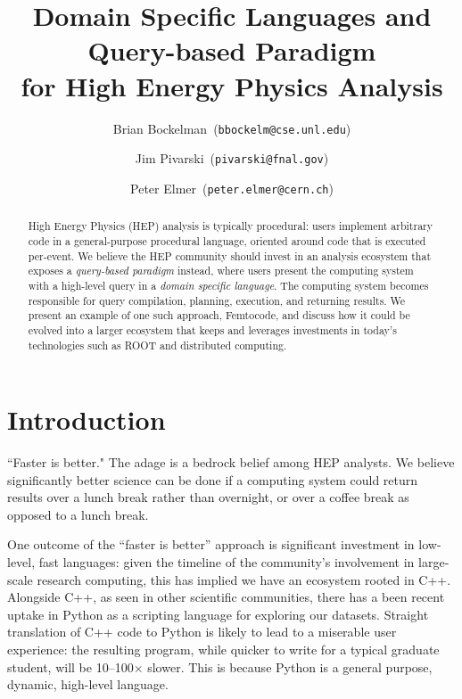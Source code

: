 \documentclass{article}
\begin{document}
\title{Domain Specific Languages and Query-based Paradigm \\ for High Energy Physics Analysis}

\author{
  Brian Bockelman\      (\texttt{bbockelm@cse.unl.edu})
  \and
  Jim Pivarski\      (\texttt{pivarski@fnal.gov})
  \and
  Peter Elmer\      (\texttt{peter.elmer@cern.ch})
}

\maketitle

\begin{abstract}
High Energy Physics (HEP) analysis is typically procedural: users implement arbitrary code in a general-purpose procedural language,  oriented around code that is executed per-event. We believe the HEP community should invest in an analysis ecosystem that exposes a {\it query-based paradigm} instead, where users present the computing system with a high-level query in a {\it domain specific language}.  The computing system becomes responsible for query compilation, planning, execution, and returning results. We present an example of one such approach, Femtocode, and discuss how it could be evolved into a larger ecosystem that keeps and leverages investments in today's technologies such as ROOT and distributed computing.
\end{abstract}

\section{Introduction}

``Faster is better." The adage is a bedrock belief among HEP analysts. We believe significantly better science can be done if a computing system could return results over a lunch break rather than overnight, or over a coffee break as opposed to a lunch break.

One outcome of the ``faster is better'' approach is significant investment in low-level, fast languages: given the timeline of the community's involvement in large-scale research computing, this has implied we have an ecosystem rooted in C++. Alongside C++, as seen in other scientific communities, there has a been recent uptake in Python as a scripting language for exploring our datasets.  Straight translation of C++ code to Python is likely to lead to a miserable user experience: the resulting program, while quicker to write for a typical graduate student, will be 10--100$\times$ slower. This is because Python is a general purpose, dynamic, high-level language.
\end{document}
